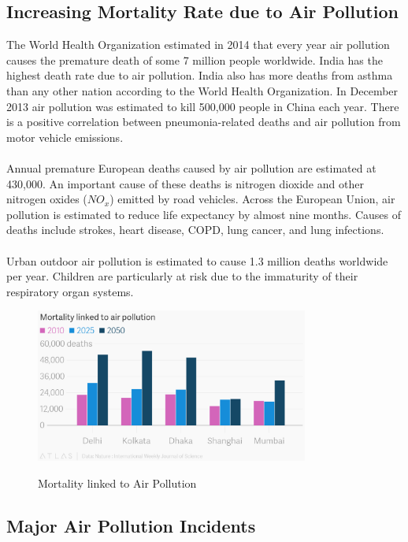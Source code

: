 \subsection{Increasing Mortality Rate due to Air Pollution}
The World Health Organization estimated in 2014 that every year air pollution causes the premature death of some 7 million people worldwide. India has the highest death rate due to air pollution. India also has more deaths from asthma than any other nation according to the World Health Organization. In December 2013 air pollution was estimated to kill 500,000 people in China each year. There is a positive correlation between pneumonia-related deaths and air pollution from motor vehicle emissions.
\\
\\
Annual premature European deaths caused by air pollution are estimated at 430,000. An important cause of these deaths is nitrogen dioxide and other nitrogen oxides ($NO_x$) emitted by road vehicles. Across the European Union, air pollution is estimated to reduce life expectancy by almost nine months. Causes of deaths include strokes, heart disease, COPD, lung cancer, and lung infections.
\\
\\
Urban outdoor air pollution is estimated to cause 1.3 million deaths worldwide per year. Children are particularly at risk due to the immaturity of their respiratory organ systems.
\begin{figure}[h]
\centering
\includegraphics[width=0.8\textwidth]{./deadly}\\[0.1in]
\caption{Mortality linked to Air Pollution}
\label{fig: Mortality Linked to Air Pollution}
\end{figure}


\subsection{Major Air Pollution Incidents}

